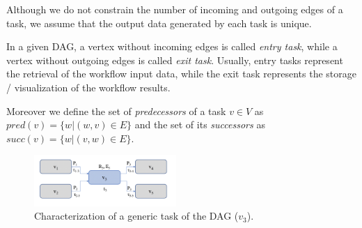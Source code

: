 \documentclass[a4paper, 10pt, conference]{ieeeconf}      %
\begin{document}
Although we do not constrain the number of incoming and outgoing edges of a task,
we assume that the output data generated by each task is unique.

In a given DAG, a vertex without incoming edges is called \textit{entry task}, while a vertex without outgoing edges is called \textit{exit task}. Usually, entry tasks represent the retrieval of the workflow input data, while the exit task represents the storage / visualization of the workflow results.

Moreover we define the set of \textit{predecessors} of a task $v \in V$ as $pred(v) =\{ w | (w,v) \in E \} $ and the set of its \textit{successors} as $succ(v) =\{ w | (v,w) \in E \}$.
\begin{figure}
  \centering
  \includegraphics[width=0.48\textwidth]{sources/task.png}
  \caption{Characterization of a generic task of the DAG ($v_3$). 
  }
\label{fig:operator}
\end{figure}
\end{document}

